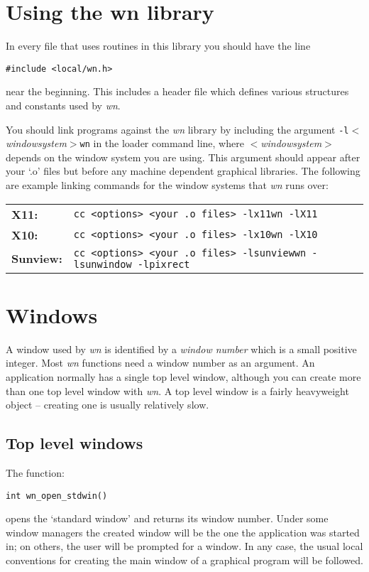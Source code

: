 \section{Using the wn library}
In every file that uses routines in this library you should have the
line
\begin{verbatim}
#include <local/wn.h>
\end{verbatim}
near the beginning.
This includes a header file which defines various structures
and constants used by {\em wn}.

You should link programs against the {\em wn} library by
including the argument {\tt -l}{\it $<$windowsystem$>$}{\tt wn} in the loader
command line, where {\it $<$windowsystem$>$} depends on the window
system you are using.
This argument should appear after your `.o' files but before any
machine dependent graphical libraries.
The following are example linking commands for the window systems that
{\em wn} runs over:

\begin{tabular}{ll}

{\bf X11:}&{\tt cc <options> <your .o files> -lx11wn -lX11}\\
{\bf X10:}&{\tt cc <options> <your .o files> -lx10wn -lX10}\\[0.1in]

{\bf Sunview:}&{\tt cc <options> <your .o files> -lsunviewwn -lsunwindow -lpixrect}\\
\end{tabular}
\section{Windows}
A window used by {\em wn} is identified by a {\em window number} which
is a small positive integer.
Most {\em wn} functions need a window number as an argument.
An application normally has a single top level window, although you can
create more than one top level window with {\em wn}.
A top level window is a fairly heavyweight object -- creating one is
usually relatively slow.
\subsection {Top level windows}
The function:
\begin{verbatim}
int wn_open_stdwin()
\end{verbatim}
opens the `standard window' and returns its window number.
Under some window managers the created window will be the one the application was started
in; on others, the user will be prompted for a window.
In any case, the usual local  conventions for creating the main window of a
graphical program will be followed.

